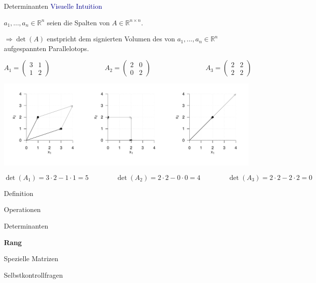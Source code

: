 \documentclass[
  8pt,
  ignorenonframetext,
]{beamer}
\begin{document}
\begin{frame}{Determinanten}
\protect\hypertarget{determinanten-7}{}
\textcolor{darkblue}{Visuelle Intuition}

\small

\(a_1,...,a_n \in \mathbb{R}^n\) seien die Spalten von
\(A \in \mathbb{R}^{n \times n}\).

\(\Rightarrow \det(A)\) enstpricht dem signierten Volumen des von
\(a_1,...,a_n\in \mathbb{R}^n\) aufgespannten Parallelotops.

\footnotesize

\begin{equation*}
A_1 =
\begin{pmatrix}
3 & 1 \\
1 & 2
\end{pmatrix}
\quad\quad\quad\quad\quad\quad\quad\quad
A_2 =
\begin{pmatrix}
2 & 0 \\
0 & 2
\end{pmatrix}
\quad\quad\quad\quad\quad\quad\quad\quad
A_3 =
\begin{pmatrix}
2 & 2 \\
2 & 2
\end{pmatrix}
\end{equation*}

\begin{center}\includegraphics[width=1\linewidth]{3_Abbildungen/alm_3_determinante} \end{center}
\vspace{-5mm}

\begin{equation*}
\det(A_1) =
3\cdot 2 - 1 \cdot 1 = 5
\quad\quad\quad\quad
\det(A_2) =
2\cdot 2 - 0 \cdot 0 = 4
\quad\quad\quad\quad
\det(A_3) =
2\cdot 2 - 2 \cdot 2 = 0
\end{equation*}
\end{frame}

\begin{frame}{}
\protect\hypertarget{section-6}{}
\large
{}
\vfill

Definition

Operationen

Determinanten

\textbf{Rang}

Spezielle Matrizen

Selbstkontrollfragen \vfill
\end{frame}
\end{document}

